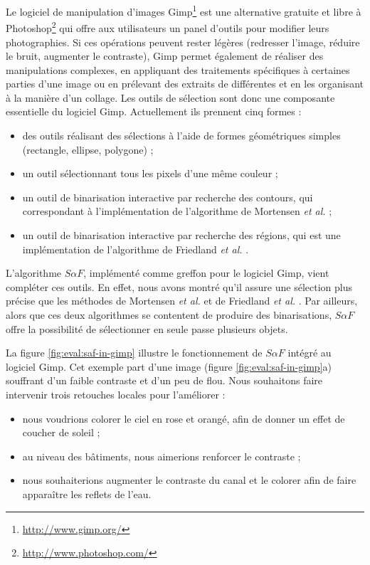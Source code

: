 Le logiciel de manipulation d'images Gimp\footnote{\url{http://www.gimp.org/}} est une alternative gratuite et libre à Photoshop\footnote{\url{http://www.photoshop.com/}} qui offre aux utilisateurs un panel d'outils pour modifier leurs photographies. Si ces opérations peuvent rester légères (redresser l'image, réduire le bruit, augmenter le contraste), Gimp permet également de réaliser des manipulations complexes, en appliquant des traitements spécifiques à certaines parties d'une image ou en prélevant des extraits de différentes  et en les organisant à la manière d'un collage. Les outils de sélection sont donc une composante essentielle du logiciel Gimp. Actuellement ils prennent cinq formes :
\begin{itemize}
\item des outils réalisant des sélections à l'aide de formes géométriques simples (rectangle, ellipse, polygone) ;
\item un outil sélectionnant tous les pixels d'une même couleur ;
\item un outil de binarisation interactive par recherche des contours, qui correspondant à l'implémentation de l'algorithme de Mortensen \textit{et al. }  \cite{mortensen1995intelligent} ;
\item un outil de binarisation interactive par recherche des régions, qui est une implémentation de l'algorithme de Friedland \textit{et al.} \cite{friedland2005siox}.
\end{itemize}

L'algorithme $S \alpha F$, implémenté comme greffon pour le logiciel Gimp, vient compléter ces outils. En effet, nous avons montré qu'il assure une sélection plus précise que les méthodes de Mortensen \textit{et al. }  \cite{mortensen1995intelligent}  et de Friedland \textit{et al.} \cite{friedland2005siox}. Par ailleurs, alors que ces deux algorithmes se contentent de produire des binarisations, $S \alpha F$ offre la possibilité de sélectionner en  seule passe plusieurs objets. 


La figure \ref{fig:eval:saf-in-gimp} illustre le fonctionnement de $S \alpha F$ intégré au logiciel Gimp. Cet exemple part d'une image (figure \ref{fig:eval:saf-in-gimp}a)  souffrant d'un faible contraste et d'un peu de flou. Nous souhaitons faire intervenir trois retouches locales pour l'améliorer :
\begin{itemize}
\item nous voudrions colorer le ciel en rose et orangé, afin de donner un effet de coucher de soleil ;
\item au niveau des bâtiments, nous aimerions renforcer le contraste ; 
\item nous souhaiterions augmenter le contraste du canal et le colorer  afin de faire apparaître les reflets de l'eau.
\end{itemize}


